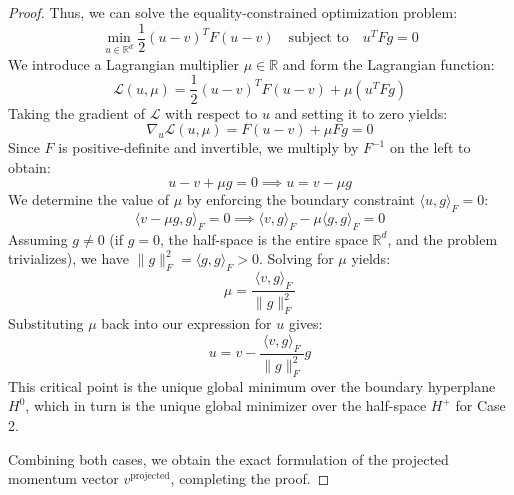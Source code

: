 \documentclass{article}
\theoremstyle{plain}
\theoremstyle{definition}
\theoremstyle{remark}
\begin{document}
\begin{proof}
Thus, we can solve the equality-constrained optimization problem:
\begin{equation}
    \min_{u \in \mathbb{R}^d} \frac{1}{2} (u - v)^T F (u - v) \quad \text{subject to} \quad u^T F g = 0
\end{equation}
We introduce a Lagrangian multiplier $\mu \in \mathbb{R}$ and form the Lagrangian function:
\begin{equation}
    \mathcal{L}(u, \mu) = \frac{1}{2} (u - v)^T F (u - v) + \mu (u^T F g)
\end{equation}
Taking the gradient of $\mathcal{L}$ with respect to $u$ and setting it to zero yields:
\begin{equation}
    \nabla_u \mathcal{L}(u, \mu) = F (u - v) + \mu F g = 0
\end{equation}
Since $F$ is positive-definite and invertible, we multiply by $F^{-1}$ on the left to obtain:
\begin{equation}
    u - v + \mu g = 0 \implies u = v - \mu g
\end{equation}
We determine the value of $\mu$ by enforcing the boundary constraint $\langle u, g \rangle_F = 0$:
\begin{equation}
    \langle v - \mu g, g \rangle_F = 0 \implies \langle v, g \rangle_F - \mu \langle g, g \rangle_F = 0
\end{equation}
Assuming $g \neq 0$ (if $g=0$, the half-space is the entire space $\mathbb{R}^d$, and the problem trivializes), we have $\|g\|_F^2 = \langle g, g \rangle_F > 0$. Solving for $\mu$ yields:
\begin{equation}
    \mu = \frac{\langle v, g \rangle_F}{\|g\|_F^2}
\end{equation}
Substituting $\mu$ back into our expression for $u$ gives:
\begin{equation}
    u = v - \frac{\langle v, g \rangle_F}{\|g\|_F^2} g
\end{equation}
This critical point is the unique global minimum over the boundary hyperplane $H^0$, which in turn is the unique global minimizer over the half-space $H^+$ for Case 2. 

Combining both cases, we obtain the exact formulation of the projected momentum vector $v^{\text{projected}}$, completing the proof.
\end{proof}
\end{document}
